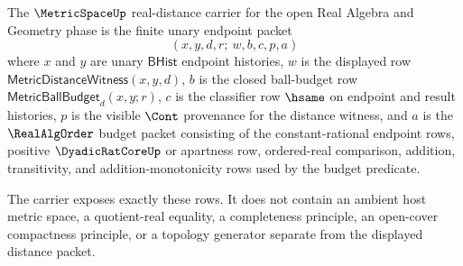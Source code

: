 \begin{definition}
\label{def:metricspace-real-distance-carrier}
The $\MetricSpaceUp$ real-distance carrier for the open Real Algebra and
Geometry phase is the finite unary endpoint packet
$$
(x,y,d,r;\ w,b,c,p,a)
$$
where $x$ and $y$ are unary $\mathsf{BHist}$ endpoint histories, $w$ is the
displayed row $\mathsf{MetricDistanceWitness}(x,y,d)$, $b$ is the closed
ball-budget row $\mathsf{MetricBallBudget}_d(x,y;r)$, $c$ is the classifier
row $\hsame$ on endpoint and result histories, $p$ is the visible $\Cont$
provenance for the distance witness, and $a$ is the $\RealAlgOrder$ budget
packet consisting of the constant-rational endpoint rows, positive
$\DyadicRatCoreUp$ or apartness row, ordered-real comparison, addition,
transitivity, and addition-monotonicity rows used by the budget predicate.

The carrier exposes exactly these rows. It does not contain an ambient host
metric space, a quotient-real equality, a completeness principle, an
open-cover compactness principle, or a topology generator separate from the
displayed distance packet.
\end{definition}

